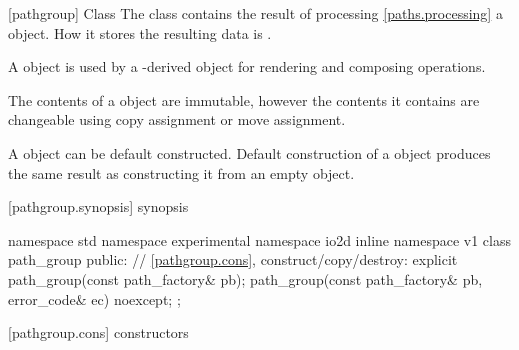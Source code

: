  [pathgroup] {Class }
\pnum
{}
The class  contains the result of processing \ref{paths.processing} a  object. How it stores the resulting data is \unspec.

\pnum
A  object is used by a -derived object for rendering and composing operations.

\pnum
The contents of a  object are immutable, however the contents it contains are changeable using copy assignment or move assignment.

\pnum
A  object can be default constructed. Default construction of a  object produces the same result as constructing it from an empty  object.
%

%
 [pathgroup.synopsis] { synopsis}

\begin{codeblock}
namespace std { namespace experimental { namespace io2d { inline namespace v1 {
  class path_group {
    public:
    // \ref{pathgroup.cons}, construct/copy/destroy:
    explicit path_group(const path_factory& pb);
    path_group(const path_factory& pb, error_code& ec) noexcept;
  };
} } } }
\end{codeblock}

 [pathgroup.cons] { constructors}

